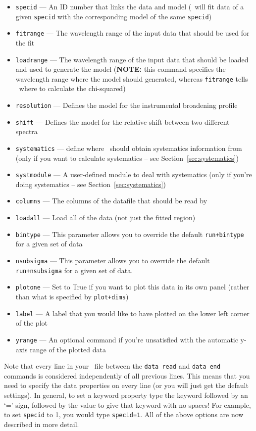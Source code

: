 \begin{itemize}
\item \texttt{specid} --- An ID number that links the data and model (\alis\ will fit data of a given \texttt{specid} with the corresponding model of the same \texttt{specid})
\item \texttt{fitrange} --- The wavelength range of the input data that should be used for the fit
\item \texttt{loadrange} --- The wavelength range of the input data that should be loaded and used to generate the model (\textbf{NOTE:} this command specifies the wavelength range where the model should generated, whereas \texttt{fitrange} tells \alis\ where to calculate the chi-squared)
\item \texttt{resolution} --- Defines the model for the instrumental broadening profile
\item \texttt{shift} --- Defines the model for the relative shift between two different spectra
\item \texttt{systematics} --- define where \alis\ should obtain systematics information from (only if you want to calculate systematics -- see Section~\ref{sec:systematics})
\item \texttt{systmodule} --- A user-defined module to deal with systematics (only if you're doing systematics -- see Section~\ref{sec:systematics})
\item \texttt{columns} --- The columns of the datafile that should be read by \alis\
\item \texttt{loadall} --- Load all of the data (not just the fitted region)
\item \texttt{bintype} --- This parameter allows you to override the default \texttt{run+bintype} for a given set of data
\item \texttt{nsubsigma} --- This parameter allows you to override the default \texttt{run+nsubsigma} for a given set of data.
\item \texttt{plotone} --- Set to True if you want to plot this data in its own panel (rather than what is specified by \texttt{plot+dims})
\item \texttt{label} --- A label that you would like to have plotted on the lower left corner of the plot
\item \texttt{yrange} --- An optional command if you're unsatisfied with the automatic y-axis range of the plotted data
\end{itemize}

Note that every line
in your \dmod\ file between the \texttt{data read}
and \texttt{data end} commands is considered
independently of all previous lines. This means
that you need to specify the data properties on
every line (or you will just get the default settings).
In general, to set a keyword property type the
keyword followed by an `=' sign, followed by the
value to give that keyword with no spaces! For
example, to set \texttt{specid} to 1, you would
type \texttt{specid=1}. All of the above options
are now described in more detail.

